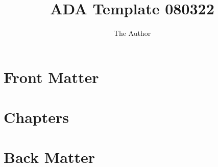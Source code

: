 \documentclass[11pt]{book}
\title{ADA Template 080322}
\author{The Author}
\begin{document}
\maketitle
\def\title#1{\chapter{#1}}
\tableofcontents

\part{Front Matter}
        
        
\part{Chapters}
        
        
        
        
        
        
\part{Back Matter}
        
        
\end{document}
